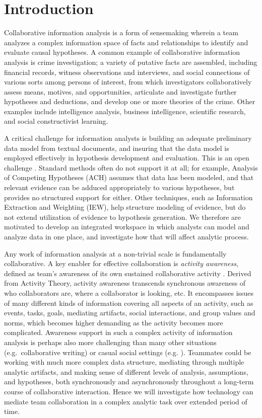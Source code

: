 \documentclass[]{article}
\date{}
\begin{document}
\section{Introduction}\label{introduction}

Collaborative information analysis is a form of sensemaking wherein a
team analyzes a complex information space of facts and relationships to
identify and evaluate causal hypotheses. A common example of
collaborative information analysis is crime investigation; a variety of
putative facts are assembled, including financial records, witness
observations and interviews, and social connections of various sorts
among persons of interest, from which investigators collaboratively
assess means, motives, and opportunities, articulate and investigate
further hypotheses and deductions, and develop one or more theories of
the crime. Other examples include intelligence analysis, business
intelligence, scientific research, and social constructivist learning.

A critical challenge for information analysts is building an adequate
preliminary data model from textual documents, and insuring that the
data model is employed effectively in hypothesis development and
evaluation. This is an open challenge \autocite{Badalamente2005}.
Standard methods often do not support it at all; for example, Analysis
of Competing Hypotheses (ACH) assumes that data has been modeled, and
that relevant evidence can be adduced appropriately to various
hypotheses, but provides no structured support for either. Other
techniques, such as Information Extraction and Weighting (IEW), help
structure modeling of evidence, but do not extend utilization of
evidence to hypothesis generation. We therefore are motivated to develop
an integrated workspace in which analysts can model and analyze data in
one place, and investigate how that will affect analytic process.

Any work of information analysis at a non-trivial scale is fundamentally
collaborative. A key enabler for effective collaboration is
\emph{activity awareness}, defined as team's awareness of its own
sustained collaborative activity \autocite{Carroll2006}. Derived from
Activity Theory, activity awareness transcends synchronous awareness of
who collaborators are, where a collaborator is looking, etc. It
encompasses issues of many different kinds of information covering all
aspects of an activity, such as events, tasks, goals, mediating
artifacts, social interactions, and group values and norms, which
becomes higher demanding as the activity becomes more complicated.
Awareness support in such a complex activity of information analysis is
perhaps also more challenging than many other situations
(e.g.~collaborative writing) or casual social settings (e.g.
\autocite{Greenberg2001}). Teammates could be working with much more
complex data structure, mediating through multiple analytic artifacts,
and making sense of different levels of analysis, assumptions, and
hypotheses, both synchronously and asynchronously throughout a long-term
course of collaborative interaction. Hence we will investigate how
technology can mediate team collaboration in a complex analytic task
over extended period of time.
\end{document}
